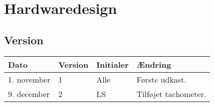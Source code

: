 \chapter{Hardwaredesign}
\section*{Version}
\begin{table}[h]
	\centering
	\begin{tabularx}{\textwidth - 2cm}{|l|l|l|X|}
	\hline
	Dato			& Version			& Initialer 		& Ændring										\\ \hline
	1. november 			& 1 				& Alle				& Første udkast. 						\\ \hline
	9. december 			& 2 				& LS				& Tilføjet tachometer.					\\ \hline

	\end{tabularx}
\end{table}
\clearpage



